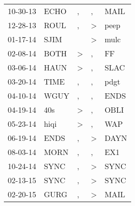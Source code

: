 \begin{supertabular}{p{0.07\textwidth}p{0.06\textwidth}p{0.02\textwidth}p{0.02\textwidth}p{0.06\textwidth}}
          10-30-13\textsuperscript{} &           ECHO\textsuperscript{} &                , &                , &           MAIL\textsuperscript{} \\
          12-28-13\textsuperscript{} &           ROUL\textsuperscript{} &                , &     \textgreater &           peep\textsuperscript{} \\
          01-17-14\textsuperscript{} &           SJIM\textsuperscript{} &                  &     \textgreater &           mulc\textsuperscript{} \\
          02-08-14\textsuperscript{} &           BOTH\textsuperscript{} &     \textgreater &                , &             FF\textsuperscript{} \\
          03-06-14\textsuperscript{} &           HAUN\textsuperscript{} &     \textgreater &                , &           SLAC\textsuperscript{} \\
          03-20-14\textsuperscript{} &           TIME\textsuperscript{} &                , &                , &           pdgt\textsuperscript{} \\
          04-10-14\textsuperscript{} &           WGUY\textsuperscript{} &                , &                , &           ENDS\textsuperscript{} \\
          04-19-14\textsuperscript{} &            40s\textsuperscript{} &     \textgreater &                , &           OBLI\textsuperscript{} \\
          05-23-14\textsuperscript{} &           hiqi\textsuperscript{} &     \textgreater &                , &            WAP\textsuperscript{} \\
          06-19-14\textsuperscript{} &           ENDS\textsuperscript{} &                , &     \textgreater &           DAYN\textsuperscript{} \\
          08-03-14\textsuperscript{} &           MORN\textsuperscript{} &                , &                , &            EX1\textsuperscript{} \\
          10-24-14\textsuperscript{} &           SYNC\textsuperscript{} &                , &     \textgreater &           SYNC\textsuperscript{} \\
          02-13-15\textsuperscript{} &           SYNC\textsuperscript{} &                , &     \textgreater &           SYNC\textsuperscript{} \\
          02-20-15\textsuperscript{} &           GURG\textsuperscript{} &                , &     \textgreater &           MAIL\textsuperscript{} \\

\end{supertabular}
